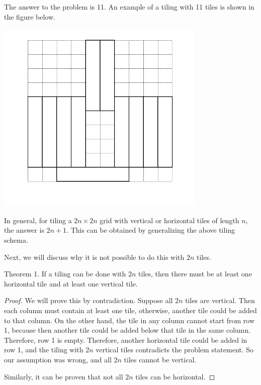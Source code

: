 \begin{solution}
The answer to the problem is 11. An example of a tiling with 11 tiles is shown in the figure below.

\begin{center}
	\includegraphics[width=10cm]{65/figs/65_sol.png}
\end{center}

In general, for tiling a $2n  \times  2n$ grid with vertical or horizontal tiles of length $n$, the answer is $2n + 1$. This can be obtained by generalizing the above tiling schema.

Next, we will discuss why it is not possible to do this with $2n$ tiles. 

\begin{theorem} Theorem 1. If a tiling can be done with $2n$ tiles, then there must be at least one horizontal tile and at least one vertical tile.
\end{theorem}

\begin{proof}We will prove this by contradiction. Suppose all $2n$ tiles are vertical. Then each column must contain at least one tile, otherwise, another tile could be added to that column. On the other hand, the tile in any column cannot start from row 1, because then another tile could be added below that tile in the same column. Therefore, row 1 is empty. Therefore, another horizontal tile could be added in row 1, and the tiling with $2n$ vertical tiles contradicts the problem statement. So our assumption was wrong, and all $2n$ tiles cannot be vertical.

Similarly, it can be proven that not all $2n$ tiles can be horizontal.
\end{proof}


\end{solution}
